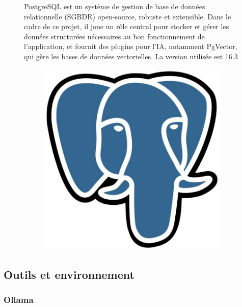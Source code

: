 \documentclass[12pt,a4paper]{report}
\begin{document}
	\begin{figure}[H]
		\begin{minipage}{0.8\textwidth}
			PostgreSQL est un système de gestion de base de données relationnelle (SGBDR) open-source, robuste et extensible. Dans le cadre de ce projet, il joue un rôle central pour stocker et gérer les données structurées nécessaires au bon fonctionnement de l’application, et fournit des plugins pour l'IA, notamment PgVector, qui gère les bases de données vectorielles. La version utilisée est 16.3
		\end{minipage}
		\hfill
		\begin{minipage}{0.15\textwidth} 
			\begin{figure}[H]
				\centering
				\includegraphics[width=\linewidth]{postgresql-logo.png}
				\label{fig:postgresql-logo}
			\end{figure}
		\end{minipage}
	\end{figure}
	
	\subsection{Outils et environnement}
	
	\subsubsection{Ollama}
	
\end{document}
